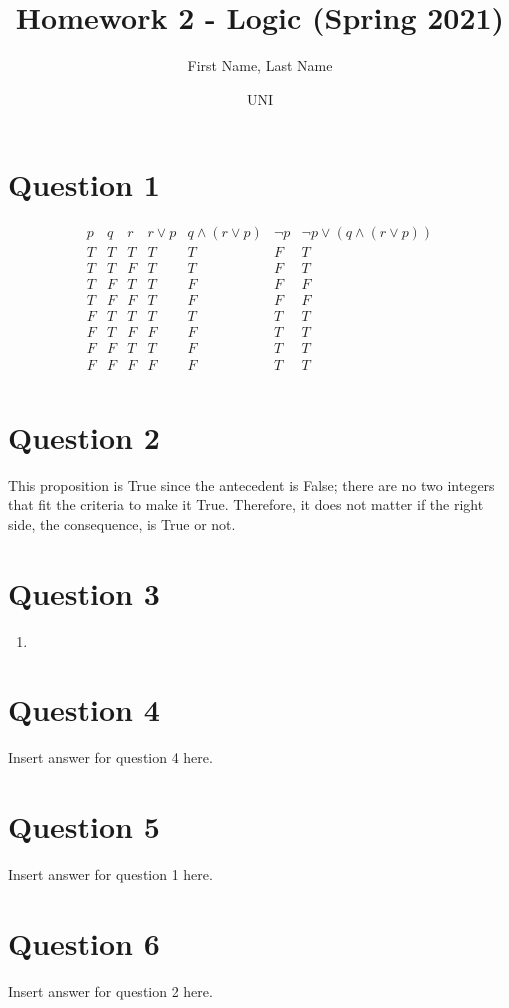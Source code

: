 \documentclass{article}
\title{Homework 2 - Logic (Spring 2021)}
\author
{
First Name, Last Name
\and UNI
}
\begin{document}
    \maketitle
    
    \section*{Question 1}
    \begin{displaymath}
    \begin{array}{|c|c|c|c|c|c|c|}
    
    p & q & r & r \lor p & q \land (r \lor p) & \neg p & \neg p \lor (q \land (r \lor p)) \\
    \hline
    T & T & T & T & T & F & T \\
    T & T & F & T & T & F & T \\
    T & F & T & T & F & F & F \\
    T & F & F & T & F & F & F \\
    F & T & T & T & T & T & T \\
    F & T & F & F & F & T & T \\
    F & F & T & T & F & T & T \\
    F & F & F & F & F & T & T \\
    \end{array}
    \end{displaymath}
    \newpage
    \section*{Question 2}
     This proposition is True since the antecedent is False; there are no two integers that fit the criteria to make it True. Therefore, it does not matter if the right side, the consequence, is True or not.
    \newpage
    \section*{Question 3}
    \begin{enumerate}
    \item
    \end{enumerate}
    \newpage
    \section*{Question 4}
    Insert answer for question 4 here.
    \newpage
    \section*{Question 5}
    Insert answer for question 1 here.
    \newpage
    \section*{Question 6}
    Insert answer for question 2 here.    
   

   
\end{document}
